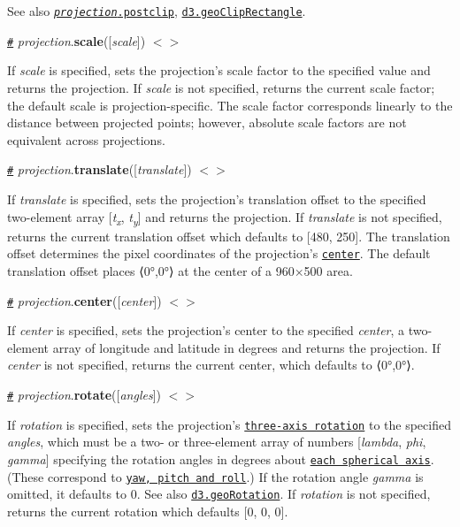 See also \href{#projection_postclip}{\tt {\itshape projection}.postclip}, \href{#geoClipRectangle}{\tt d3.\+geo\+Clip\+Rectangle}.

\href{#projection_scale}{\tt \#} {\itshape projection}.{\bfseries scale}(\mbox{[}{\itshape scale}\mbox{]}) \href{https://github.com/d3/d3-geo/blob/master/src/projection/index.js#L60}{\tt $<$$>$}

If {\itshape scale} is specified, sets the projection’s scale factor to the specified value and returns the projection. If {\itshape scale} is not specified, returns the current scale factor; the default scale is projection-\/specific. The scale factor corresponds linearly to the distance between projected points; however, absolute scale factors are not equivalent across projections.

\href{#projection_translate}{\tt \#} {\itshape projection}.{\bfseries translate}(\mbox{[}{\itshape translate}\mbox{]}) \href{https://github.com/d3/d3-geo/blob/master/src/projection/index.js#L64v}{\tt $<$$>$}

If {\itshape translate} is specified, sets the projection’s translation offset to the specified two-\/element array \mbox{[}{\itshape t\textsubscript{x}}, {\itshape t\textsubscript{y}}\mbox{]} and returns the projection. If {\itshape translate} is not specified, returns the current translation offset which defaults to \mbox{[}480, 250\mbox{]}. The translation offset determines the pixel coordinates of the projection’s \href{#projection_center}{\tt center}. The default translation offset places ⟨0°,0°⟩ at the center of a 960×500 area.

\href{#projection_center}{\tt \#} {\itshape projection}.{\bfseries center}(\mbox{[}{\itshape center}\mbox{]}) \href{https://github.com/d3/d3-geo/blob/master/src/projection/index.js#L68}{\tt $<$$>$}

If {\itshape center} is specified, sets the projection’s center to the specified {\itshape center}, a two-\/element array of longitude and latitude in degrees and returns the projection. If {\itshape center} is not specified, returns the current center, which defaults to ⟨0°,0°⟩.

\href{#projection_rotate}{\tt \#} {\itshape projection}.{\bfseries rotate}(\mbox{[}{\itshape angles}\mbox{]}) \href{https://github.com/d3/d3-geo/blob/master/src/projection/index.js#L72}{\tt $<$$>$}

If {\itshape rotation} is specified, sets the projection’s \href{https://bl.ocks.org/mbostock/4282586}{\tt three-\/axis rotation} to the specified {\itshape angles}, which must be a two-\/ or three-\/element array of numbers \mbox{[}{\itshape lambda}, {\itshape phi}, {\itshape gamma}\mbox{]} specifying the rotation angles in degrees about \href{https://bl.ocks.org/mbostock/4282586}{\tt each spherical axis}. (These correspond to \href{http://en.wikipedia.org/wiki/Aircraft_principal_axes}{\tt yaw, pitch and roll}.) If the rotation angle {\itshape gamma} is omitted, it defaults to 0. See also \href{#geoRotation}{\tt d3.\+geo\+Rotation}. If {\itshape rotation} is not specified, returns the current rotation which defaults \mbox{[}0, 0, 0\mbox{]}.


